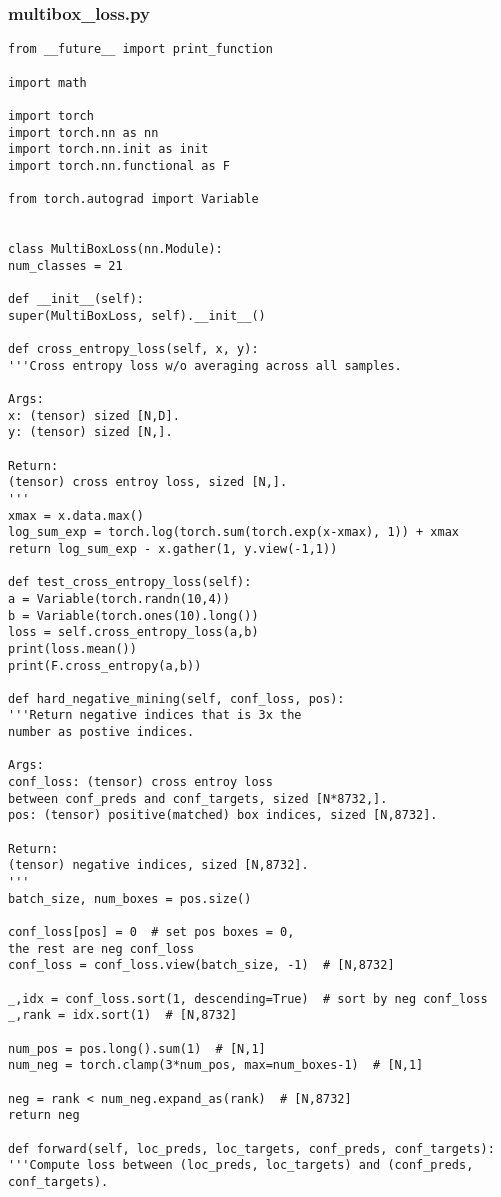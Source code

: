 \subsubsection*{multibox\_loss.py}
\begin{lstlisting}
from __future__ import print_function

import math

import torch
import torch.nn as nn
import torch.nn.init as init
import torch.nn.functional as F

from torch.autograd import Variable


class MultiBoxLoss(nn.Module):
num_classes = 21

def __init__(self):
super(MultiBoxLoss, self).__init__()

def cross_entropy_loss(self, x, y):
'''Cross entropy loss w/o averaging across all samples.

Args:
x: (tensor) sized [N,D].
y: (tensor) sized [N,].

Return:
(tensor) cross entroy loss, sized [N,].
'''
xmax = x.data.max()
log_sum_exp = torch.log(torch.sum(torch.exp(x-xmax), 1)) + xmax
return log_sum_exp - x.gather(1, y.view(-1,1))

def test_cross_entropy_loss(self):
a = Variable(torch.randn(10,4))
b = Variable(torch.ones(10).long())
loss = self.cross_entropy_loss(a,b)
print(loss.mean())
print(F.cross_entropy(a,b))

def hard_negative_mining(self, conf_loss, pos):
'''Return negative indices that is 3x the 
number as postive indices.

Args:
conf_loss: (tensor) cross entroy loss 
between conf_preds and conf_targets, sized [N*8732,].
pos: (tensor) positive(matched) box indices, sized [N,8732].

Return:
(tensor) negative indices, sized [N,8732].
'''
batch_size, num_boxes = pos.size()

conf_loss[pos] = 0  # set pos boxes = 0, 
the rest are neg conf_loss
conf_loss = conf_loss.view(batch_size, -1)  # [N,8732]

_,idx = conf_loss.sort(1, descending=True)  # sort by neg conf_loss
_,rank = idx.sort(1)  # [N,8732]

num_pos = pos.long().sum(1)  # [N,1]
num_neg = torch.clamp(3*num_pos, max=num_boxes-1)  # [N,1]

neg = rank < num_neg.expand_as(rank)  # [N,8732]
return neg

def forward(self, loc_preds, loc_targets, conf_preds, conf_targets):
'''Compute loss between (loc_preds, loc_targets) and (conf_preds, conf_targets).


\end{lstlisting}
